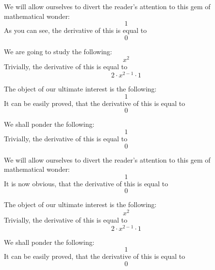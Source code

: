 \documentclass{article}
\begin{document}
We will allow ourselves to divert the reader's attention to this gem of mathematical wonder:
\begin{equation}
1 
\end{equation}
As you can see, the derivative of this is equal to
\begin{equation}
0 
\end{equation}

We are going to study the following:
\begin{equation}
x ^{2 } 
\end{equation}
Trivially, the derivative of this is equal to
\begin{equation}
2 \cdot x ^{2 - 1 } \cdot 1 
\end{equation}

The object of our ultimate interest is the following:
\begin{equation}
1 
\end{equation}
It can be easily proved, that the derivative of this is equal to
\begin{equation}
0 
\end{equation}

We shall ponder the following:
\begin{equation}
1 
\end{equation}
Trivially, the derivative of this is equal to
\begin{equation}
0 
\end{equation}

We will allow ourselves to divert the reader's attention to this gem of mathematical wonder:
\begin{equation}
1 
\end{equation}
It is now obvious, that the derivative of this is equal to
\begin{equation}
0 
\end{equation}

The object of our ultimate interest is the following:
\begin{equation}
x ^{2 } 
\end{equation}
Trivially, the derivative of this is equal to
\begin{equation}
2 \cdot x ^{2 - 1 } \cdot 1 
\end{equation}

We shall ponder the following:
\begin{equation}
1 
\end{equation}
It can be easily proved, that the derivative of this is equal to
\begin{equation}
0 
\end{equation}
\end{document}
